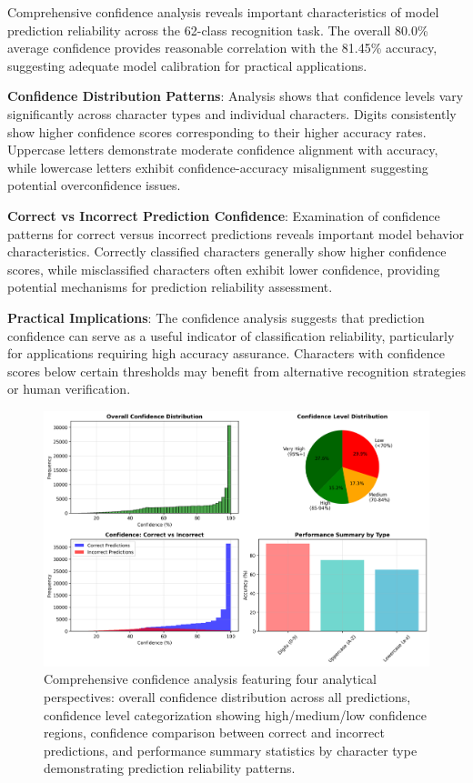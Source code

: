 \documentclass[11pt,a4paper]{report}
\begin{document}
Comprehensive confidence analysis reveals important characteristics of model prediction reliability across the 62-class recognition task. The overall 80.0\% average confidence provides reasonable correlation with the 81.45\% accuracy, suggesting adequate model calibration for practical applications.

\textbf{Confidence Distribution Patterns}: Analysis shows that confidence levels vary significantly across character types and individual characters. Digits consistently show higher confidence scores corresponding to their higher accuracy rates. Uppercase letters demonstrate moderate confidence alignment with accuracy, while lowercase letters exhibit confidence-accuracy misalignment suggesting potential overconfidence issues.

\textbf{Correct vs Incorrect Prediction Confidence}: Examination of confidence patterns for correct versus incorrect predictions reveals important model behavior characteristics. Correctly classified characters generally show higher confidence scores, while misclassified characters often exhibit lower confidence, providing potential mechanisms for prediction reliability assessment.

\textbf{Practical Implications}: The confidence analysis suggests that prediction confidence can serve as a useful indicator of classification reliability, particularly for applications requiring high accuracy assurance. Characters with confidence scores below certain thresholds may benefit from alternative recognition strategies or human verification.

\begin{figure}[H]
\centering
\includegraphics[width=\textwidth]{universal_confidence_analysis.png}
\caption{Comprehensive confidence analysis featuring four analytical perspectives: overall confidence distribution across all predictions, confidence level categorization showing high/medium/low confidence regions, confidence comparison between correct and incorrect predictions, and performance summary statistics by character type demonstrating prediction reliability patterns.}
\label{fig:universal_confidence}
\end{figure}
\end{document}
